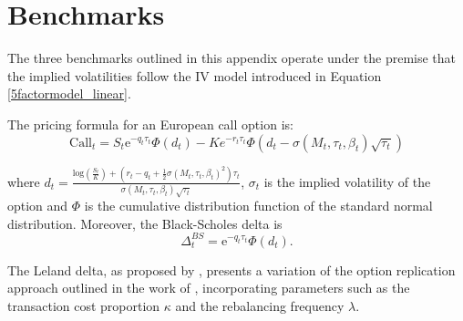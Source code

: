 \documentclass[12pt]{article}
\begin{document}

{%


%
%
  
}


\appendix


\section{Benchmarks}\label{appen:benchmarks}

The three benchmarks outlined in this appendix operate under the premise that the implied volatilities follow the IV model introduced in Equation \eqref{5factormodel_linear}.


The \cite{BlackScholes} pricing formula for an European call option is:
$$\mbox{Call}_{t}=S_{t} \mbox{e}^{-q_{t}\tau_{t}}\Phi(d_{t})-K e^{ -r_{t}\tau_{t}}\Phi(d_{t} - \sigma (M_{t},\tau_{t},\beta_{t})\sqrt{\tau_{t}})$$

where $d_{t}=\frac{\mbox{log}\left( \frac{S_{t}}{K} \right)+\left( r_{t}-q_{t}+\frac{1}{2}\sigma (M_{t},\tau_{t},\beta_{t})^2 \right)\tau_{t}}{\sigma (M_{t},\tau_{t},\beta_{t}) \sqrt{\tau_{t}}}$, $\sigma_t$ is the implied volatility of the option and $\Phi$ is the cumulative distribution function of the standard normal distribution. Moreover, the Black-Scholes delta is
\begin{equation*}
    \Delta_{t}^{BS} = \mbox{e}^{-q_{t}\tau_{t}}\Phi(d_{t}).
\end{equation*}


The Leland delta, as proposed by \cite{Leland}, presents a variation of the option replication approach outlined in the work of \cite{BlackScholes}, incorporating parameters such as the transaction cost proportion $\kappa$ and the rebalancing frequency $\lambda$.
\end{document}
